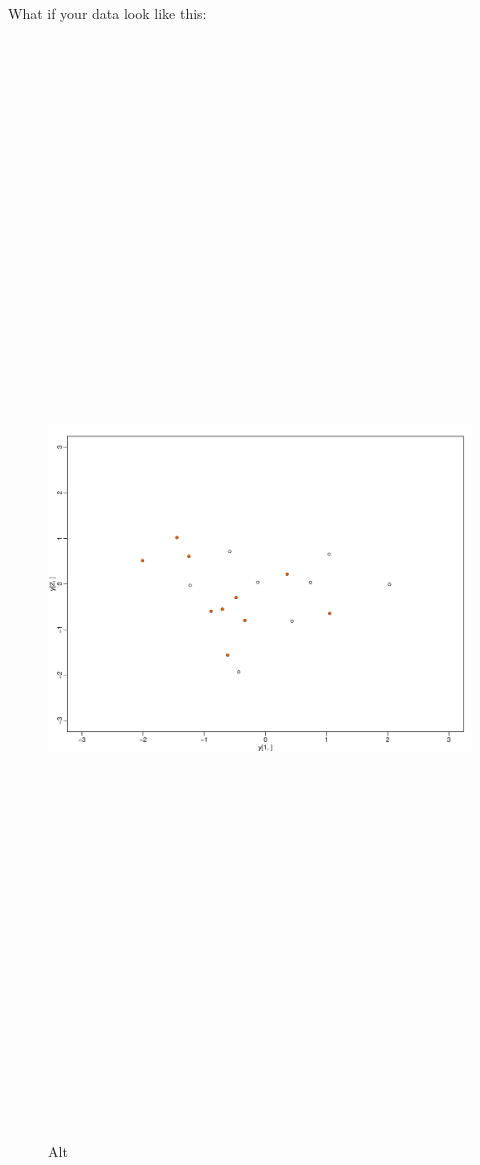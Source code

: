 \documentclass[
]{article}
\begin{document}
What if your data look like this:

\begin{figure}
\centering
\includegraphics[width=1\textwidth,height=12.5in]{MMCnogo.pdf}
\caption{Alt}
\end{figure}
\end{document}
